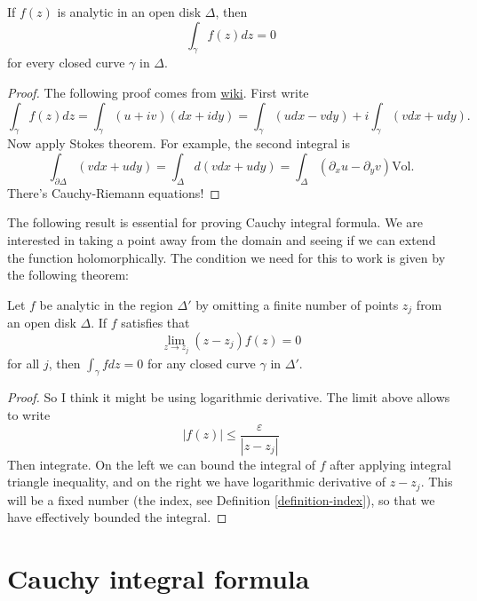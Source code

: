 \begin{theorem}[Cauchy]
\label{theorem-cauchy}
If $f(z)$ is analytic in an open disk $\Delta$, then
\begin{equation}
\label{equationcauchy-theorem}
\int_\gamma f(z)dz=0
\end{equation}
for every closed curve $\gamma$ in $\Delta$.
\end{theorem}

\begin{proof}
The following proof comes from 
\href{https://en.wikipedia.org/wiki/Cauchy%27s_integral_theorem}{wiki}.
First write
$$
\int_\gamma f(z)dz=\int_\gamma(u+iv)(dx+idy)
=\int_\gamma (udx-vdy)+i\int_\gamma(vdx+udy).
$$
Now apply Stokes theorem. For example, the second integral is
$$
\int_{\partial\Delta}(vdx+udy)=\int_\Delta d(vdx+udy)
=\int_\Delta(\partial_xu-\partial_yv)\text{Vol}.
$$
There's Cauchy-Riemann equations!
\end{proof}

\noindent
The following result is essential for proving Cauchy integral formula.
We are interested in taking a point away from the domain
and seeing if we can extend the function holomorphically.
The condition we need for this to work is given by the following theorem:

\begin{theorem}
\label{theorem-cauchy-removable}
Let $f$ be analytic in the region $\Delta'$ by omitting a finite number of
points $z_j$ from an open disk $\Delta$. If $f$ satisfies that
\begin{equation}
\label{equation-removable-singularity}
\lim_{z\to z_j} (z-z_j)f(z)=0
\end{equation}
for all $j$, then $\int_\gamma fdz=0$ for any closed curve
$\gamma$ in $\Delta'$.
\end{theorem}

\begin{proof}[Proof]
So I think it might be using logarithmic derivative. The limit above allows to
write
$$
|f(z)|\leq \frac{\varepsilon}{|z-z_j|}
$$
Then integrate. On the left we can bound the integral of $f$ after applying
integral triangle inequality, and on the right we have logarithmic derivative of
$z-z_j$. This will be a fixed number (the index, see Definition
\ref{definition-index}), so that we have effectively bounded the integral.
\end{proof}

\section{Cauchy integral formula}
\label{sectioncauchy-integral-formula}

